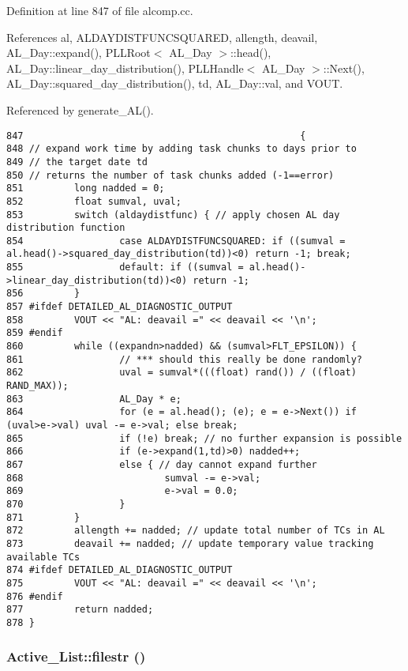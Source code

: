 Definition at line 847 of file alcomp.cc.

References al, ALDAYDISTFUNCSQUARED, allength, deavail, AL\_\-Day::expand(), PLLRoot$<$ AL\_\-Day $>$::head(), AL\_\-Day::linear\_\-day\_\-distribution(), PLLHandle$<$ AL\_\-Day $>$::Next(), AL\_\-Day::squared\_\-day\_\-distribution(), td, AL\_\-Day::val, and VOUT.

Referenced by generate\_\-AL().



\footnotesize\begin{verbatim}847                                                 {
848 // expand work time by adding task chunks to days prior to
849 // the target date td
850 // returns the number of task chunks added (-1==error)
851         long nadded = 0;
852         float sumval, uval;
853         switch (aldaydistfunc) { // apply chosen AL day distribution function
854                 case ALDAYDISTFUNCSQUARED: if ((sumval = al.head()->squared_day_distribution(td))<0) return -1; break;
855                 default: if ((sumval = al.head()->linear_day_distribution(td))<0) return -1;
856         }
857 #ifdef DETAILED_AL_DIAGNOSTIC_OUTPUT
858         VOUT << "AL: deavail =" << deavail << '\n';
859 #endif
860         while ((expandn>nadded) && (sumval>FLT_EPSILON)) {
861                 // *** should this really be done randomly?
862                 uval = sumval*(((float) rand()) / ((float) RAND_MAX));
863                 AL_Day * e;
864                 for (e = al.head(); (e); e = e->Next()) if (uval>e->val) uval -= e->val; else break;
865                 if (!e) break; // no further expansion is possible
866                 if (e->expand(1,td)>0) nadded++;
867                 else { // day cannot expand further
868                         sumval -= e->val;
869                         e->val = 0.0;
870                 }
871         }
872         allength += nadded; // update total number of TCs in AL
873         deavail += nadded; // update temporary value tracking available TCs
874 #ifdef DETAILED_AL_DIAGNOSTIC_OUTPUT
875         VOUT << "AL: deavail =" << deavail << '\n';
876 #endif
877         return nadded;
878 }
\end{verbatim}\normalsize 
{}
\subsubsection{ Active\_\-List::filestr ()\hspace{0.3cm}{\tt  [inline]}}\label{classActive__List_a2}




